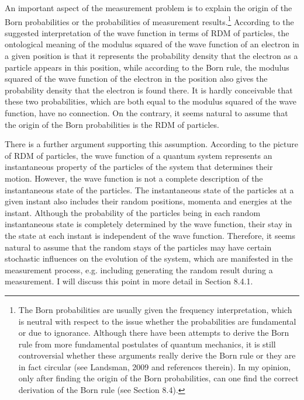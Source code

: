 An important aspect of the measurement problem is to explain the origin of the Born probabilities or the probabilities of measurement results.\footnote{The Born probabilities are usually given the frequency interpretation, which is neutral with respect to the issue whether the probabilities are fundamental or due to ignorance. Although there have been attempts to derive the Born rule from more fundamental postulates of quantum mechanics, it is still controversial whether these arguments really derive the Born rule or they are in fact circular (see Landsman, 2009 and references therein). In my opinion, only after finding the origin of the Born probabilities, can one find the correct derivation of the Born rule (see Section 8.4).} 
According to the suggested interpretation of the wave function in terms of RDM of particles, the ontological meaning of the modulus squared of the wave function of an electron in a given position is that it represents the probability density that the electron as a particle appears in this position, while according to the Born rule, the modulus squared of the wave function of the electron in the position also gives the probability density that the electron is found there. It is hardly conceivable that these two probabilities, which are both equal to the modulus squared of the wave function, have no connection. On the contrary, it seems natural to assume that the origin of the Born probabilities is the RDM of particles. 

There is a further argument supporting this assumption.
According to the picture of RDM of particles, the wave function of a quantum system represents an instantaneous property of the particles of the system that determines their motion. However, the wave function is not a complete description of the instantaneous state of the particles. The instantaneous state of the particles at a given instant also includes their random positions, momenta and energies at the instant. Although the probability of the particles being in each random instantaneous state is completely determined by the wave function, their stay in the state at each instant is independent of the wave function.
Therefore, it seems natural to assume that the random stays of the particles may have certain stochastic influences on the evolution of the system, which are manifested in the measurement process, e.g. including generating the random result during a measurement. I will discuss this point in more detail in Section 8.4.1.

